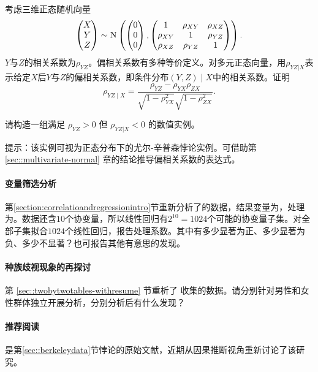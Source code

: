 考虑三维正态随机向量
$$
\begin{pmatrix}
X\\
Y\\
Z
\end{pmatrix}
\sim 
\textsc{N}
\left(
\begin{pmatrix}
0\\
0\\
0
\end{pmatrix},
\begin{pmatrix}
1 & \rho_{XY} &\rho_{XZ} \\
  \rho_{XY}  & 1 & \rho_{YZ} \\
  \rho_{XZ} &  \rho_{YZ} & 1
\end{pmatrix}
\right) . 
$$
$Y$与$Z$的相关系数为$\rho_{YZ}$。偏相关系数有多种等价定义。对多元正态向量，用$\rho_{YZ|X}$表示给定$X$后$Y$与$Z$的偏相关系数，即条件分布$(Y, Z)\mid X$中的相关系数。证明
$$
\rho_{YZ\mid X} = \frac{   \rho_{YZ} - \rho_{YX} \rho_{ZX}  }{  \sqrt{  1-\rho_{YX}^2 }  \sqrt{1- \rho_{ZX}^2  }  }  . 
$$

请构造一组满足 $\rho_{YZ} > 0$ 但 $\rho_{YZ|X} < 0$ 的数值实例。 

提示：该实例可视为正态分布下的尤尔-辛普森悖论实例。可借助第 \ref{sec::multivariate-normal} 章的结论推导偏相关系数的表达式。 



\paragraph{变量筛选分析}\label{hw::lalonde-obs-reg}

第\ref{section:correlatioandregressionintro}节重新分析了\citet{hainmueller2012entropy}的数据，结果变量为，处理为。数据还含$10$个协变量，所以线性回归有$2^{10} = 1024$个可能的协变量子集。对全部子集拟合$1024$个线性回归，报告处理系数。其中有多少显著为正、多少显著为负、多少不显著？也可报告其他有意思的发现。


\paragraph{种族歧视现象的再探讨}

第 \ref{sec::twobytwotables-withresume} 节重析了 \citet{bertrand2004emily} 收集的数据。请分别针对男性和女性群体独立开展分析，分别分析后有什么发现？


\paragraph{推荐阅读}

\citet{bickel1975sex}是第\ref{sec::berkeleydata}节悖论的原始文献，\citet{pearl2018book}近期从因果推断视角重新讨论了该研究。 


